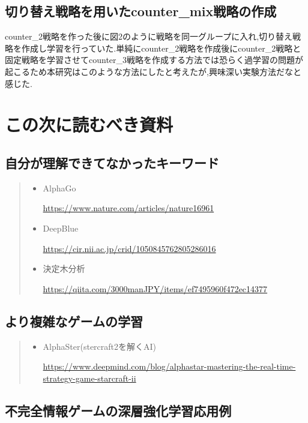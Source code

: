 \documentclass{jarticle}     %
\begin{document}
\subsection*{切り替え戦略を用いたcounter\_mix戦略の作成}
counter\_2戦略を作った後に図2のように戦略を同一グループに入れ,切り替え戦略を作成し学習を行っていた.単純にcounter\_2戦略を作成後にcounter\_2戦略と固定戦略を学習させてcounter\_3戦略を作成する方法では恐らく過学習の問題が起こるため本研究はこのような方法にしたと考えたが,興味深い実験方法だなと感じた.

\section*{この次に読むべき資料}



\subsection*{自分が理解できてなかったキーワード}

\begin{quote}
  \begin{itemize}
   \item AlphaGo \par
   \url{https://www.nature.com/articles/nature16961}
   \item DeepBlue\par
   \url{https://cir.nii.ac.jp/crid/1050845762805286016}
   \item 決定木分析\par
   \url{https://qiita.com/3000manJPY/items/ef7495960f472ec14377}
  \end{itemize}
 \end{quote}

\subsection*{より複雑なゲームの学習}

\begin{quote}
  \begin{itemize}
   \item AlphaSter(stercraft2を解くAI) \par
   \url{https://www.deepmind.com/blog/alphastar-mastering-the-real-time-strategy-game-starcraft-ii}
  \end{itemize}
 \end{quote}

\subsection*{不完全情報ゲームの深層強化学習応用例}
\end{document}
